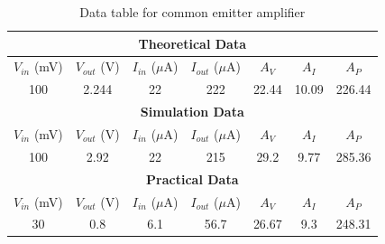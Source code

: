 \documentclass[12pt]{article}
\begin{document}
\bgroup
\def\arraystretch{1.5}
\begin{table}[h!]
    \centering
    \caption{Data table for common emitter amplifier}
    \label{tab:CE table}
    \begin{tabular}{|c|c|c|c|c|c|c|}
        \hline
        \multicolumn{7}{|c|}{\textbf{Theoretical Data}} \\
        \hline
        $V_{in}$ (mV) & $V_{out}$ (V) & $I_{in}$ ($\mu$A) & $I_{out}$ ($\mu$A) & $A_V$ & $A_I$ & $A_P$ \\ \hline
        100 & 2.244 & 22 & 222 & 22.44 & 10.09 & 226.44 \\ \hline\hline
        \multicolumn{7}{|c|}{\textbf{Simulation Data}} \\
        \hline
        $V_{in}$ (mV) & $V_{out}$ (V) & $I_{in}$ ($\mu$A) & $I_{out}$ ($\mu$A) & $A_V$ & $A_I$ & $A_P$ \\ \hline
        100 & 2.92 & 22 & 215 & 29.2 & 9.77 & 285.36 \\ \hline\hline
        \multicolumn{7}{|c|}{\textbf{Practical Data}} \\
        \hline
        $V_{in}$ (mV) & $V_{out}$ (V) & $I_{in}$ ($\mu$A) & $I_{out}$ ($\mu$A) & $A_V$ & $A_I$ & $A_P$ \\ \hline
        30 & 0.8 & 6.1 & 56.7 & 26.67 & 9.3 & 248.31 \\ \hline
    \end{tabular}
\end{table}
\egroup
\end{document}
